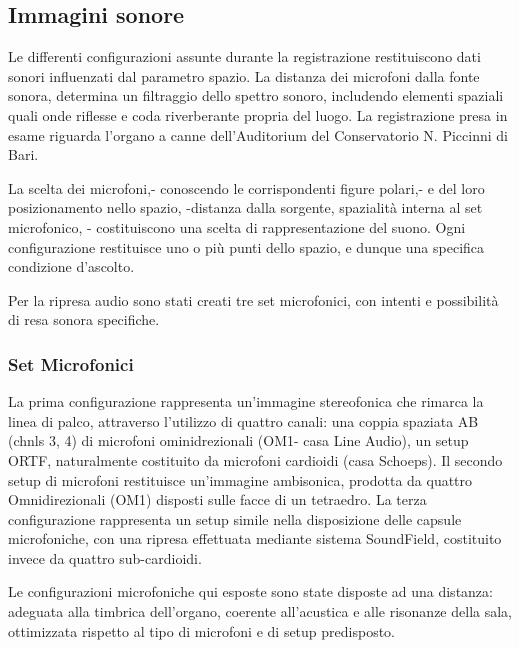 \subsection*{Immagini sonore}
Le differenti configurazioni assunte durante la registrazione restituiscono 
dati sonori influenzati dal parametro spazio.
La distanza dei microfoni dalla fonte sonora, determina un filtraggio dello 
spettro sonoro, includendo elementi spaziali quali onde riflesse e coda 
riverberante propria del luogo.
La registrazione presa in esame riguarda l'organo a canne dell'Auditorium 
del Conservatorio N. Piccinni di Bari.

\begin{warn}
La scelta dei microfoni,- conoscendo le corrispondenti figure polari,- e del 
loro posizionamento nello spazio, -distanza dalla sorgente, spazialità interna 
al set microfonico, - costituiscono una scelta di rappresentazione del suono.
Ogni configurazione restituisce uno o più punti dello spazio, e dunque una 
specifica condizione d'ascolto.

\end{warn}


Per la ripresa audio sono stati creati tre set microfonici, con intenti e 
possibilità di resa sonora specifiche. %

\subsubsection*{Set Microfonici}
La prima configurazione rappresenta un'immagine stereofonica che 
rimarca la linea di palco, attraverso l'utilizzo di quattro canali:
una coppia spaziata AB (chnls 3, 4) di microfoni ominidrezionali 
(OM1- casa Line Audio), un setup ORTF, naturalmente costituito da 
microfoni cardioidi (casa Schoeps).
Il secondo setup di microfoni restituisce un'immagine ambisonica, prodotta 
da quattro Omnidirezionali (OM1) disposti sulle facce di un tetraedro.
La terza configurazione rappresenta un setup simile nella disposizione 
delle capsule microfoniche, con una ripresa effettuata mediante sistema 
SoundField, costituito invece da quattro sub-cardioidi.

Le configurazioni microfoniche qui esposte sono state disposte ad una 
distanza: adeguata alla timbrica dell'organo, coerente all'acustica e alle 
risonanze della sala, ottimizzata rispetto al tipo di microfoni e di setup 
predisposto.

